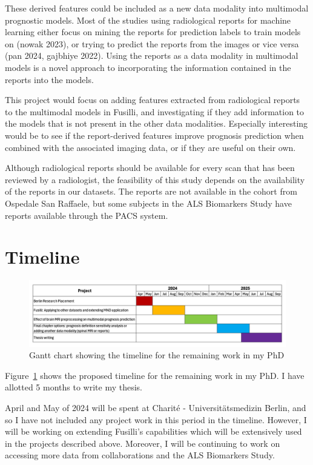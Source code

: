 These derived features could be included as a new data modality into multimodal prognostic models.
Most of the studies using radiological reports for machine learning either focus on mining the reports for prediction labels to train models on (nowak 2023), or trying to predict the reports from the images or vice versa (pan 2024, gajbhiye 2022).
Using the reports as a data modality in multimodal models is a novel approach to incorporating the information contained in the reports into the models.

This project would focus on adding features extracted from radiological reports to the multimodal models in Fusilli, and investigating if they add information to the models that is not present in the other data modalities.
Especially interesting would be to see if the report-derived features improve prognosis prediction when combined with the associated imaging data, or if they are useful on their own.

Although radiological reports should be available for every scan that has been reviewed by a radiologist, the feasibility of this study depends on the availability of the reports in our datasets.
The reports are not available in the cohort from Ospedale San Raffaele, but some subjects in the ALS Biomarkers Study have reports available through the PACS system.

\section{Timeline}

\begin{figure}
    \centering
    \hspace*{-0.1\textwidth}
    \includegraphics[width=1.2\textwidth]{figures/gantt_chart}
    \caption{Gantt chart showing the timeline for the remaining work in my PhD}
    \label{fig:gantt_chart}
\end{figure}

Figure~\ref{fig:gantt_chart} shows the proposed timeline for the remaining work in my PhD.
I have allotted 5 months to write my thesis.

April and May of 2024 will be spent at Charité - Universitätsmedizin Berlin, and so I have not included any project work in this period in the timeline.
However, I will be working on extending Fusilli's capabilities which will be extensively used in the projects described above.
Moreover, I will be continuing to work on accessing more data from collaborations and the ALS Biomarkers Study.
